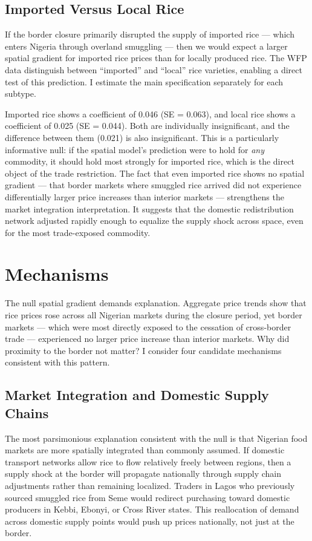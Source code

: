 \documentclass[12pt]{article}
\begin{document}
\subsection{Imported Versus Local Rice}

If the border closure primarily disrupted the supply of imported rice --- which enters Nigeria through overland smuggling --- then we would expect a larger spatial gradient for imported rice prices than for locally produced rice. The WFP data distinguish between ``imported'' and ``local'' rice varieties, enabling a direct test of this prediction. I estimate the main specification separately for each subtype.

Imported rice shows a coefficient of 0.046 (SE = 0.063), and local rice shows a coefficient of 0.025 (SE = 0.044). Both are individually insignificant, and the difference between them (0.021) is also insignificant. This is a particularly informative null: if the spatial model's prediction were to hold for \emph{any} commodity, it should hold most strongly for imported rice, which is the direct object of the trade restriction. The fact that even imported rice shows no spatial gradient --- that border markets where smuggled rice arrived did not experience differentially larger price increases than interior markets --- strengthens the market integration interpretation. It suggests that the domestic redistribution network adjusted rapidly enough to equalize the supply shock across space, even for the most trade-exposed commodity.


\section{Mechanisms}
\label{sec:mechanisms}

The null spatial gradient demands explanation. Aggregate price trends show that rice prices rose across all Nigerian markets during the closure period, yet border markets --- which were most directly exposed to the cessation of cross-border trade --- experienced no larger price increase than interior markets. Why did proximity to the border not matter? I consider four candidate mechanisms consistent with this pattern.

\subsection{Market Integration and Domestic Supply Chains}

The most parsimonious explanation consistent with the null is that Nigerian food markets are more spatially integrated than commonly assumed. If domestic transport networks allow rice to flow relatively freely between regions, then a supply shock at the border will propagate nationally through supply chain adjustments rather than remaining localized. Traders in Lagos who previously sourced smuggled rice from Seme would redirect purchasing toward domestic producers in Kebbi, Ebonyi, or Cross River states. This reallocation of demand across domestic supply points would push up prices nationally, not just at the border.
\end{document}
